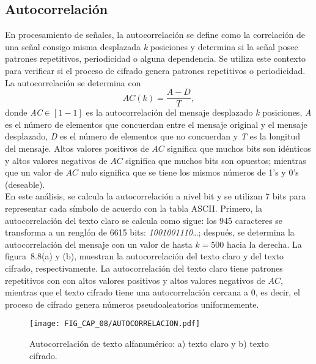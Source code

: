 \subsection{Autocorrelación}
En procesamiento de señales, la autocorrelación se define como la correlación de una señal consigo misma desplazada \textit{k} posiciones y determina si la señal posee patrones repetitivos, periodicidad o alguna dependencia. Se utiliza este contexto para verificar si el proceso de cifrado genera patrones repetitivos o periodicidad. La autocorrelación se determina con
\begin{equation}
AC(k) = \frac {A-D}{T},
\end{equation}
donde \textit{AC}$\in [1 -1]$ es la autocorrelación del mensaje desplazado \textit{k} posiciones, \textit{A} es el número de elementos que concuerdan entre el mensaje original y el mensaje desplazado, \textit{D} es el número de elementos que no concuerdan y \textit{T} es la longitud del mensaje. Altos valores positivos de $AC$ significa que muchos bits son idénticos y altos valores negativos de $AC$ significa que muchos bits son opuestos; mientras que un valor de $AC$ nulo significa que se tiene los mismos números de 1's y 0's (deseable).   \\

En este análisis, se calcula la autocorrelación a nivel bit y se utilizan 7 bits para representar cada símbolo de acuerdo con la tabla ASCII. Primero, la autocorrelación del texto claro se calcula como sigue: los 945 caracteres se transforma a un renglón de 6615 bits: \textit{1001001110}\ldots; después, se determina la autocorrelación del mensaje con un valor de hasta $k=500$ hacia la derecha. La figura~8.8(a) y (b), muestran la autocorrelación del texto claro y del texto cifrado, respectivamente. La autocorrelación del texto claro tiene patrones repetitivos con con altos valores positivos y altos valores negativos de $AC$, mientras que el texto cifrado tiene una autocorrelación cercana a 0, es decir, el proceso de cifrado genera números pseudoaleatorios uniformemente.

\begin{figure}[!htbp] %
	\center
	\texttt{[image: FIG\_CAP\_08/AUTOCORRELACION.pdf]}    
	\caption{Autocorrelación de texto alfanumérico: a) texto claro y b) texto cifrado.}
\end{figure}

